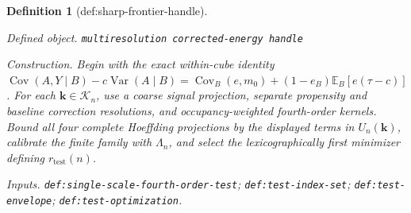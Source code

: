\documentclass{article}
\newtheorem{definition}{Definition}
\begin{document}
\begin{definition}[def:sharp-frontier-handle]\label{def:sharp-frontier-handle}
\par\smallskip\noindent\emph{Defined object.} \texttt{multiresolution corrected-\allowbreak{}energy handle}
\par\smallskip\noindent\emph{Construction.} Begin with the exact within-cube identity \(\operatorname{Cov}(A,Y\mid B)-c\operatorname{Var}(A\mid B)=\operatorname{Cov}_B(e,m_0)+(1-e_B)\mathbb E_B[e(\tau-c)]\). For each \(\mathbf k\in\mathcal K_n\), use a coarse signal projection, separate propensity and baseline correction resolutions, and occupancy-weighted fourth-order kernels. Bound all four complete Hoeffding projections by the displayed terms in \(U_n(\mathbf k)\), calibrate the finite family with \(\Lambda_n\), and select the lexicographically first minimizer defining \(r_{\mathrm{test}}(n)\).
\par\smallskip\noindent\emph{Inputs.} \texttt{def:\allowbreak{}single-\allowbreak{}scale-\allowbreak{}fourth-\allowbreak{}order-\allowbreak{}test}; \texttt{def:\allowbreak{}test-\allowbreak{}index-\allowbreak{}set}; \texttt{def:\allowbreak{}test-\allowbreak{}envelope}; \texttt{def:\allowbreak{}test-\allowbreak{}optimization}.
\end{definition}
\end{document}
